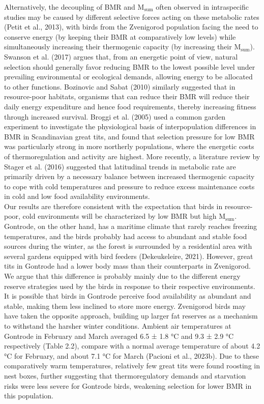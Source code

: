 \documentclass[10pt, twoside]{book} %
\begin{document}
Alternatively, the decoupling of BMR and M$_{\text{sum}}$ often observed in intraspecific studies may be caused by different selective forces acting on these metabolic rates (Petit et al., 2013), with birds from the Zvenigorod population facing the need to conserve energy (by keeping their BMR at comparatively low levels) while simultaneously increasing their thermogenic capacity (by increasing their M$_{\text{sum}}$). Swanson et al. (2017) argues that, from an energetic point of view, natural selection should generally favor reducing BMR to the lowest possible level under prevailing environmental or ecological demands, allowing energy to be allocated to other functions. Bozinovic and Sabat (2010) similarly suggested that in resource-poor habitats, organisms that can reduce their BMR will reduce their daily energy expenditure and hence food requirements, thereby increasing fitness through increased survival. Broggi et al. (2005) used a common garden experiment to investigate the physiological basis of interpopulation differences in BMR in Scandinavian great tits, and found that selection pressure for low BMR was particularly strong in more northerly populations, where the energetic costs of thermoregulation and activity are highest. More recently, a literature review by Stager et al. (2016) suggested that latitudinal trends in metabolic rate are primarily driven by a necessary balance between increased thermogenic capacity to cope with cold temperatures and pressure to reduce excess maintenance costs in cold and low food availability environments. \\

Our results are therefore consistent with the expectation that birds in resource-poor, cold environments will be characterized by low BMR but high M$_{\text{sum}}$. Gontrode, on the other hand, has a maritime climate that rarely reaches freezing temperatures, and the birds probably had access to abundant and stable food sources during the winter, as the forest is surrounded by a residential area with several gardens equipped with bird feeders (Dekeukeleire, 2021). However, great tits in Gontrode had a lower body mass than their counterparts in Zvenigorod. We argue that this difference is probably mainly due to the different energy reserve strategies used by the birds in response to their respective environments. It is possible that birds in Gontrode perceive food availability as abundant and stable, making them less inclined to store more energy. Zvenigorod birds may have taken the opposite approach, building up larger fat reserves as a mechanism to withstand the harsher winter conditions. Ambient air temperatures at Gontrode in February and March averaged 6.5 ± 1.8 °C and 9.3 ± 2.9 °C respectively (Table 2.2), compare with a normal average temperature of about 4.2 °C for February, and about 7.1 °C for March (Pacioni et al., 2023b). Due to these comparatively warm temperatures, relatively few great tits were found roosting in nest boxes, further suggesting that thermoregulatory demands and starvation risks were less severe for Gontrode birds, weakening selection for lower BMR in this population.\\
\end{document}
